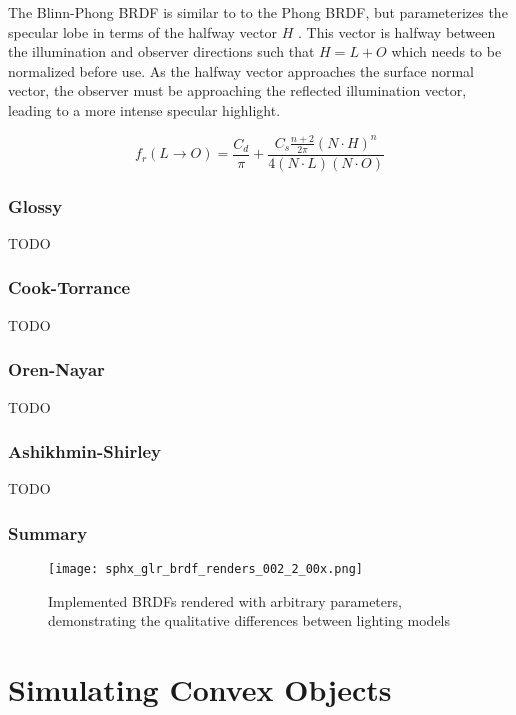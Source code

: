 The Blinn-Phong BRDF is similar to to the Phong BRDF, but parameterizes the specular lobe in terms of the halfway vector $H$ \cite{duvenhage2013}. This vector is halfway between the illumination and observer directions such that $H = L + O$ which needs to be normalized before use. As the halfway vector approaches the surface normal vector, the observer must be approaching the reflected illumination vector, leading to a more intense specular highlight. 

\begin{equation} \label{eq:brdf_blinn_phong}
  f_r(L \rightarrow O) = \frac{C_d}{\pi} + \frac{C_s \frac{n+2}{2\pi} (N \cdot H)^n}{4 (N \cdot L)(N \cdot O)}
\end{equation}

\subsubsection{Glossy}

TODO

\subsubsection{Cook-Torrance}

TODO

\subsubsection{Oren-Nayar}

TODO

\subsubsection{Ashikhmin-Shirley}

TODO

\subsubsection{Summary}

\begin{figure}[ht]
  \texttt{[image: sphx\_glr\_brdf\_renders\_002\_2\_00x.png]}
  \caption
  {Implemented BRDFs rendered with arbitrary parameters, demonstrating the qualitative differences between lighting models}
  \label{fig:brdf_renders}
\end{figure}

\section{Simulating Convex Objects}

